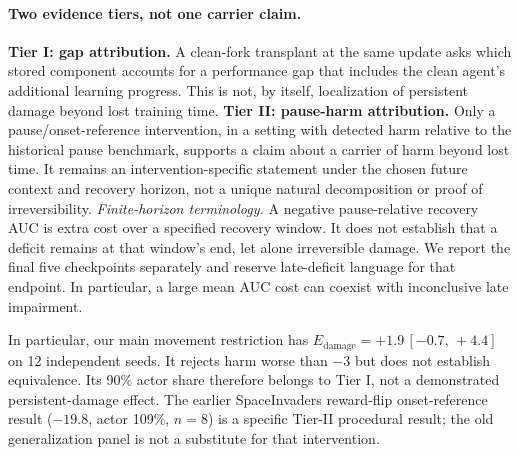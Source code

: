\documentclass[10pt]{article} %
\newcommand{\ci}[2]{\,[#1,\,#2]}
\begin{document}
\paragraph{Two evidence tiers, not one carrier claim.}
\textbf{Tier I: gap attribution.} A clean-fork transplant at the same update asks which stored component accounts for a performance gap that includes the clean agent's additional learning progress. This is not, by itself, localization of persistent damage beyond lost training time.
\textbf{Tier II: pause-harm attribution.} Only a pause/onset-reference intervention, in a setting with detected harm relative to the historical pause benchmark, supports a claim about a carrier of harm beyond lost time. It remains an intervention-specific statement under the chosen future context and recovery horizon, not a unique natural decomposition or proof of irreversibility.
\emph{Finite-horizon terminology.} A negative pause-relative recovery AUC is extra cost over a specified recovery window. It does not establish that a deficit remains at that window's end, let alone irreversible damage. We report the final five checkpoints separately and reserve late-deficit language for that endpoint. In particular, a large mean AUC cost can coexist with inconclusive late impairment.

In particular, our main movement restriction has $E_{\mathrm{damage}}=+1.9\ci{-0.7}{+4.4}$ on 12 independent seeds. It rejects harm worse than $-3$ but does not establish equivalence. Its 90\% actor share therefore belongs to Tier I, not a demonstrated persistent-damage effect. The earlier SpaceInvaders reward-flip onset-reference result ($-19.8$, actor 109\%, $n=8$) is a specific Tier-II procedural result; the old generalization panel is not a substitute for that intervention.
\end{document}
